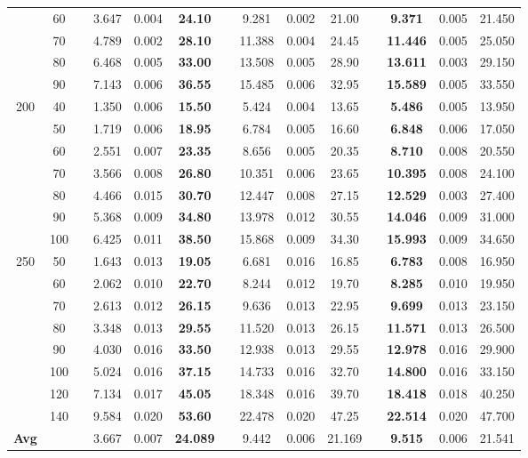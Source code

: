 \documentclass[algorithms,article,accept,moreauthors,pdftex]{Definitions/mdpi}
\begin{document}
\begin{specialtable}
\begin{footnotesize}
\begin{tabular}{cccccccccccccc}
  & 60 & &   3.647 & 0.004 & {\bf 24.10}  & &  9.281 & 0.002 & 21.00  & &  {\bf 9.371} &  0.005 & 21.450\\
  & 70 & &   4.789 & 0.002 & {\bf 28.10}  & & 11.388 & 0.004 & 24.45  & &  {\bf 11.446} &  0.005 & 25.050\\
  & 80 & &   6.468 & 0.005 & {\bf 33.00}  & & 13.508 & 0.005 & 28.90  & &  {\bf 13.611}&  0.003 & 29.150\\
  & 90 & &   7.143 & 0.006 & {\bf 36.55}  & & 15.485 & 0.006 & 32.95  & &  {\bf 15.589}&  0.005 & 33.550\\
    \midrule
 200 & 40 & &   1.350 & 0.006 & {\bf 15.50}  & &  5.424 & 0.004 & 13.65  & &  {\bf 5.486} & 0.005 & 13.950\\
     & 50 & &   1.719 & 0.006 & {\bf 18.95}  & &  6.784 & 0.005 & 16.60  & &  {\bf 6.848} & 0.006 & 17.050\\
     & 60 & &   2.551 & 0.007 & {\bf 23.35}  & &  8.656 & 0.005 & 20.35  & &  {\bf 8.710} & 0.008 & 20.550\\
     & 70 & &   3.566 & 0.008 & {\bf 26.80}  & & 10.351 & 0.006 & 23.65  & &  {\bf 10.395}& 0.008 & 24.100\\
     & 80 & &   4.466 & 0.015 & {\bf 30.70}  & & 12.447 & 0.008 & 27.15  & &  {\bf 12.529}& 0.003 & 27.400\\
     & 90 & &   5.368 & 0.009 & {\bf 34.80}  & & 13.978 & 0.012 & 30.55  & &  {\bf 14.046}& 0.009 & 31.000\\
      & 100 & & 6.425 & 0.011 & {\bf 38.50}  & & 15.868 & 0.009 & 34.30  & &  {\bf 15.993}& 0.009 & 34.650\\
    \midrule
250 & 50 & &   1.643 & 0.013 & {\bf 19.05}  & &  6.681 & 0.016 & 16.85  & &  {\bf 6.783} & 0.008 & 16.950\\
    & 60 & &   2.062 & 0.010 & {\bf 22.70}  & &  8.244 & 0.012 & 19.70  & &  {\bf 8.285} & 0.010 & 19.950\\
    & 70 & &   2.613 & 0.012 & {\bf 26.15}  & &  9.636 & 0.013 & 22.95  & &  {\bf 9.699} & 0.013 & 23.150\\
    & 80 & &   3.348 & 0.013 & {\bf 29.55}  & & 11.520 & 0.013 & 26.15  & &  {\bf 11.571}& 0.013 & 26.500\\
    & 90 & &   4.030 & 0.016 & {\bf 33.50}  & & 12.938 & 0.013 & 29.55  & &  {\bf 12.978}& 0.016 & 29.900\\
   & 100 & &   5.024 & 0.016 & {\bf 37.15}  & & 14.733 & 0.016 & 32.70  & &  {\bf 14.800}& 0.016 & 33.150\\
   & 120 & &   7.134 & 0.017 & {\bf 45.05}  & & 18.348 & 0.016 & 39.70  & &  {\bf 18.418}& 0.018 & 40.250\\
   & 140 & &   9.584 & 0.020 & {\bf 53.60}  & & 22.478 & 0.020 & 47.25  & &  {\bf 22.514}& 0.020 & 47.700\\
   \midrule
\textbf{Avg}  & & & 3.667  & 0.007 & \textbf{24.089}  & & 9.442 & 0.006 & 21.169 & & \textbf{9.515}  &    0.006 & 21.541 \\
\bottomrule
\end{tabular}
\end{footnotesize}
\end{specialtable}
\end{document}
